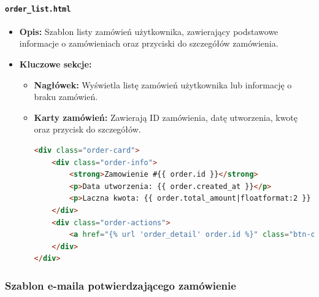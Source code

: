 \documentclass[12pt,a4paper,oneside]{article}
\theoremstyle{definition}
\numberwithin{equation}{section}
\begin{document}
\paragraph{\texttt{order\_list.html}}
\begin{itemize}
    \item \textbf{Opis:} 
    Szablon listy zamówień użytkownika, zawierający podstawowe informacje o zamówieniach oraz przyciski do szczegółów zamówienia.
    \item \textbf{Kluczowe sekcje:}
    \begin{itemize}
        \item \textbf{Nagłówek:} Wyświetla listę zamówień użytkownika lub informację o braku zamówień.
        \item \textbf{Karty zamówień:} Zawierają ID zamówienia, datę utworzenia, kwotę oraz przycisk do szczegółów.
        \begin{lstlisting}[language=HTML]
<div class="order-card">
    <div class="order-info">
        <strong>Zamowienie #{{ order.id }}</strong>
        <p>Data utworzenia: {{ order.created_at }}</p>
        <p>Laczna kwota: {{ order.total_amount|floatformat:2 }} zl</p>
    </div>
    <div class="order-actions">
        <a href="{% url 'order_detail' order.id %}" class="btn-order-details">Szczegoly</a>
    </div>
</div>
        \end{lstlisting}
    \end{itemize}
\end{itemize}

\subsubsection{Szablon e-maila potwierdzającego zamówienie}
\end{document}
